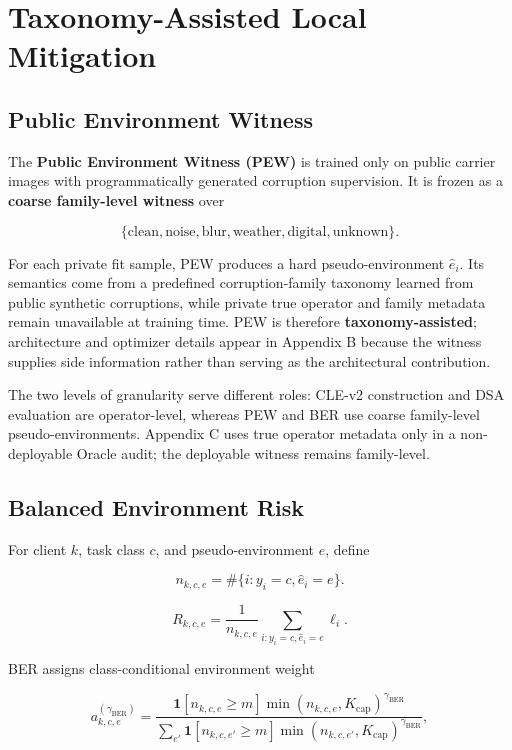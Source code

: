 \section{Taxonomy-Assisted Local Mitigation}

\subsection{Public Environment Witness}

The \textbf{Public Environment Witness (PEW)} is trained only on public carrier images with programmatically generated corruption supervision. It is frozen as a \textbf{coarse family-level witness} over

\[
\{\text{clean},\text{noise},\text{blur},\text{weather},\text{digital},\text{unknown}\}.
\]

For each private fit sample, PEW produces a hard pseudo-environment \(\hat e_i\). Its semantics come from a predefined corruption-family taxonomy learned from public synthetic corruptions, while private true operator and family metadata remain unavailable at training time. PEW is therefore \textbf{taxonomy-assisted}; architecture and optimizer details appear in Appendix B because the witness supplies side information rather than serving as the architectural contribution.

The two levels of granularity serve different roles: CLE-v2 construction and DSA evaluation are operator-level, whereas PEW and BER use coarse family-level pseudo-environments. Appendix C uses true operator metadata only in a non-deployable Oracle audit; the deployable witness remains family-level.

\subsection{Balanced Environment Risk}

For client \(k\), task class \(c\), and pseudo-environment \(e\), define

\[
n_{k,c,e}=\#\{i:y_i=c,\hat e_i=e\}.
\]

\[
R_{k,c,e}=\frac1{n_{k,c,e}}\sum_{i:y_i=c,\hat e_i=e}\ell_i.
\]

BER assigns class-conditional environment weight

\[
a^{(\gamma_{\mathrm{BER}})}_{k,c,e}
=
\frac{
\mathbf 1[n_{k,c,e}\ge m]
\min(n_{k,c,e},K_{\mathrm{cap}})^{\gamma_{\mathrm{BER}}}
}{
\sum_{e'}
\mathbf 1[n_{k,c,e'}\ge m]
\min(n_{k,c,e'},K_{\mathrm{cap}})^{\gamma_{\mathrm{BER}}}
},
\]

